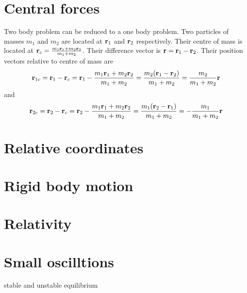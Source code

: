 \documentclass[12pt]{article}
\begin{document}
\section*{Central forces}
Two body problem can be reduced to a one body problem. Two particles of masses $m_1$ and $m_2$ are located at $\vb{r}_1$ and $\vb{r}_2$ respectively. Their centre of mass is located at $\vb{r}_c=\frac{m_1\vb{r}_1+m_2\vb{r}_2}{m_1+m_2}$. Their difference vector is $\vb{r}=\vb{r}_1-\vb{r}_2$. Their position vectors relative to centre of mass are \[\vb{r}_{1c}=\vb{r}_{1}-\vb{r}_{c}=\vb{r}_{1}-\frac{m_1\vb{r}_1+m_2\vb{r}_2}{m_1+m_2}=\frac{m_2(\vb{r}_1-\vb{r}_2)}{m_1+m_2}=\frac{m_2}{m_1+m_2}\vb{r}\] and 
\[\vb{r}_{2c}=\vb{r}_{2}-\vb{r}_{c}=\vb{r}_{2}-\frac{m_1\vb{r}_1+m_2\vb{r}_2}{m_1+m_2}=\frac{m_1(\vb{r}_2-\vb{r}_1)}{m_1+m_2}=-\frac{m_1}{m_1+m_2}\vb{r}\]

\section*{Relative coordinates}
\section*{Rigid body motion}
\section*{Relativity}
\section*{Small oscilltions}
stable and unstable equilibrium
\end{document}
